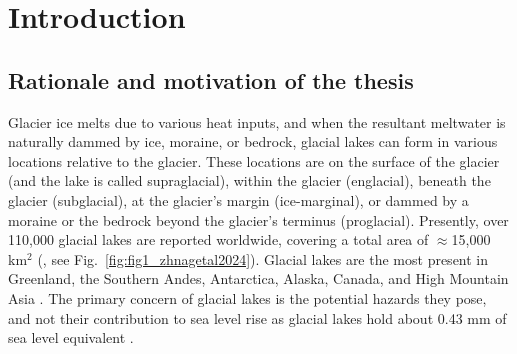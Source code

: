 \chapter{Introduction}
\label{ch:introduction}

\section{Rationale and motivation of the thesis}

Glacier ice melts due to various heat inputs, and when the resultant meltwater is naturally dammed by ice, moraine, or bedrock, glacial lakes can form in various locations relative to the glacier. These locations are on the surface of the glacier (and the lake is called supraglacial), within the glacier (englacial), beneath the glacier (subglacial), at the glacier's margin (ice-marginal), or dammed by a moraine or the bedrock beyond the glacier's terminus (proglacial). Presently, over 110,000 glacial lakes are reported worldwide, covering a total area of  $\approx$15,000 km$^2$ (\cite{Zhang&al2024}, see Fig.~\ref{fig:fig1_zhnagetal2024}). Glacial lakes are the most present in Greenland, the Southern Andes, Antarctica, Alaska, Canada, and High Mountain Asia \citep{Shugar&al2020}. The primary concern of glacial lakes is the potential hazards they pose, and not their contribution to sea level rise as glacial lakes hold about 0.43 mm of sea level equivalent \citep{Shugar&al2020}. 

